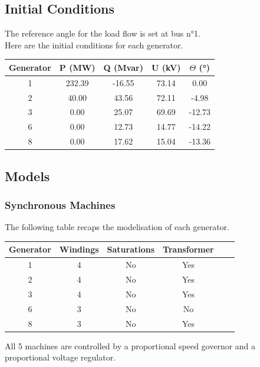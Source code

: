 \documentclass[a4paper, 12pt]{report}
\begin{document}
\subsection{Initial Conditions}

The reference angle for the load flow is set at bus n°1. \\

Here are the initial conditions for each generator.

\begin{center}
\begin{tabular}{|c|c|c|c|c|}
  \hline
  Generator & P (MW) & Q (Mvar) & U (kV) & $\Theta$ (°) \\
  \hline
  1 & 232.39 & -16.55 & 73.14 & 0.00\\
  2 & 40.00 & 43.56 & 72.11 & -4.98\\
  3 & 0.00 & 25.07 & 69.69 & -12.73\\
  6 & 0.00 & 12.73 & 14.77 & -14.22\\
  8 & 0.00 & 17.62 & 15.04 & -13.36\\
  \hline
\end{tabular}
\end{center}

\subsection{Models}

\subsubsection{Synchronous Machines}

The following table recaps the modelisation of each generator.

\begin{center}
\begin{tabular}{|c|c|c|c|c|c|}
  \hline
  Generator & Windings  & Saturations & Transformer\\
  \hline
  1 & 4 & No & Yes\\
  2 & 4 & No & Yes\\
  3 & 4 & No & Yes\\
  6 & 3 & No & No\\
  8 & 3 & No & Yes\\
  \hline
\end{tabular}
\end{center}

All 5 machines are controlled by a proportional speed governor and a proportional voltage regulator. \\
\end{document}
